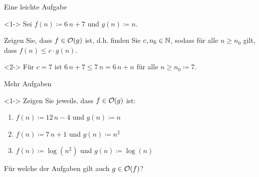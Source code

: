 \begin{frame}{Eine leichte Aufgabe}
\begin{task}<1->
Sei $f(n) \coloneqq 6 \, n + 7$ und $g(n) \coloneqq n$.

Zeigen Sie, dass $f \in \mathcal{O}(g)$ ist, d.h. finden Sie $c, n_0 \in \mathbb{N}$, sodass f\"ur alle $n \geq n_0$ gilt, dass $f(n) \leq c \cdot g(n)$.
\end{task}

\begin{solution}<2->
F\"ur $c = 7$ ist $6 \, n + 7 \leq 7 \, n = 6 \, n + n$ f\"ur alle $n \geq n_0 \coloneqq 7$.
\end{solution}
\end{frame}

\begin{frame}{Mehr Aufgaben}
\begin{task}<1->
Zeigen Sie jeweils, dass $f \in \mathcal{O}(g)$ ist:
\begin{enumerate}
    \item $f(n) \coloneqq 12 \, n - 4$ und $g(n) \coloneqq n$
    \item $f(n) \coloneqq 7 \, n + 1$ und $g(n) \coloneqq n^2$
    \item $f(n) \coloneqq \log(n^2)$ und $g(n) \coloneqq \log(n)$
\end{enumerate}
F\"ur welche der Aufgaben gilt auch $g \in \mathcal{O}(f)$?
\end{task}
\end{frame}